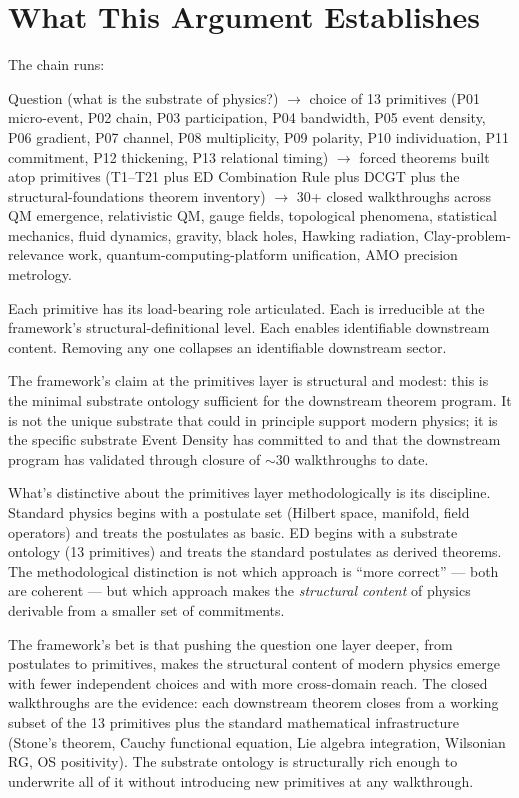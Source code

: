 \documentclass[11pt,a4paper]{article}
\begin{document}
\section{What This Argument Establishes}

The chain runs:

Question (what is the substrate of physics?) $\to$ choice of 13 primitives (P01 micro-event, P02 chain, P03 participation, P04 bandwidth, P05 event density, P06 gradient, P07 channel, P08 multiplicity, P09 polarity, P10 individuation, P11 commitment, P12 thickening, P13 relational timing) $\to$ forced theorems built atop primitives (T1--T21 plus ED Combination Rule plus DCGT plus the structural-foundations theorem inventory) $\to$ 30+ closed walkthroughs across QM emergence, relativistic QM, gauge fields, topological phenomena, statistical mechanics, fluid dynamics, gravity, black holes, Hawking radiation, Clay-problem-relevance work, quantum-computing-platform unification, AMO precision metrology.

Each primitive has its load-bearing role articulated. Each is irreducible at the framework's structural-definitional level. Each enables identifiable downstream content. Removing any one collapses an identifiable downstream sector.

The framework's claim at the primitives layer is structural and modest: this is the minimal substrate ontology sufficient for the downstream theorem program. It is not the unique substrate that could in principle support modern physics; it is the specific substrate Event Density has committed to and that the downstream program has validated through closure of $\sim 30$ walkthroughs to date.

What's distinctive about the primitives layer methodologically is its discipline. Standard physics begins with a postulate set (Hilbert space, manifold, field operators) and treats the postulates as basic. ED begins with a substrate ontology (13 primitives) and treats the standard postulates as derived theorems. The methodological distinction is not which approach is ``more correct'' --- both are coherent --- but which approach makes the \emph{structural content} of physics derivable from a smaller set of commitments.

The framework's bet is that pushing the question one layer deeper, from postulates to primitives, makes the structural content of modern physics emerge with fewer independent choices and with more cross-domain reach. The closed walkthroughs are the evidence: each downstream theorem closes from a working subset of the 13 primitives plus the standard mathematical infrastructure (Stone's theorem, Cauchy functional equation, Lie algebra integration, Wilsonian RG, OS positivity). The substrate ontology is structurally rich enough to underwrite all of it without introducing new primitives at any walkthrough.
\end{document}
